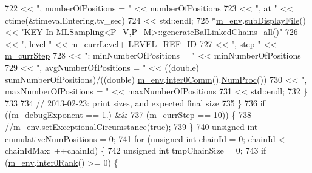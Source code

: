 \begin{DoxyCode}
722                               << \textcolor{stringliteral}{", numberOfPositions = "} << numberOfPositions
723                               << \textcolor{stringliteral}{", at "}                  << ctime(&timevalEntering.tv\_sec)
724                               << std::endl;
725       *\hyperlink{class_q_u_e_s_o_1_1_m_l_sampling_a13f1ca4fe9f94822fe572a743eaced1d}{m\_env}.\hyperlink{class_q_u_e_s_o_1_1_base_environment_a8a0064746ae8dddfece4229b9ad374d6}{subDisplayFile}() << \textcolor{stringliteral}{"KEY In
       MLSampling<P\_V,P\_M>::generateBalLinkedChains\_all()"}
726                               << \textcolor{stringliteral}{", level "}                  << \hyperlink{class_q_u_e_s_o_1_1_m_l_sampling_af9416874c856e50f3b35270e801f17e4}{m\_currLevel}+
      \hyperlink{_m_l_sampling_level_options_8h_a68d15eaf394d210effcf584b938206d3}{LEVEL\_REF\_ID}
727                               << \textcolor{stringliteral}{", step "}                   << \hyperlink{class_q_u_e_s_o_1_1_m_l_sampling_a1b1f8ccb4823bdfa26ec652f0807c63e}{m\_currStep}
728                               << \textcolor{stringliteral}{": minNumberOfPositions = "} << minNumberOfPositions
729                               << \textcolor{stringliteral}{", avgNumberOfPositions = "} << ((double) sumNumberOfPositions)/((double) 
      \hyperlink{class_q_u_e_s_o_1_1_m_l_sampling_a13f1ca4fe9f94822fe572a743eaced1d}{m\_env}.\hyperlink{class_q_u_e_s_o_1_1_base_environment_a689e4d140c74d495d97eb498714a4b82}{inter0Comm}().\hyperlink{class_q_u_e_s_o_1_1_mpi_comm_aa780721ae0fdeabc5a15e04cb0cad964}{NumProc}())
730                               << \textcolor{stringliteral}{", maxNumberOfPositions = "} << maxNumberOfPositions
731                               << std::endl;
732     \}
733 
734     \textcolor{comment}{// 2013-02-23: print sizes, and expected final size}
735   \}
736   \textcolor{keywordflow}{if} ((\hyperlink{class_q_u_e_s_o_1_1_m_l_sampling_abdd5cd35419283c33cc40a77d0f4f07f}{m\_debugExponent} == 1.) &&
737       (\hyperlink{class_q_u_e_s_o_1_1_m_l_sampling_a1b1f8ccb4823bdfa26ec652f0807c63e}{m\_currStep}      == 10)) \{
738     \textcolor{comment}{//m\_env.setExceptionalCircumstance(true);}
739   \}
740   \textcolor{keywordtype}{unsigned} \textcolor{keywordtype}{int} cumulativeNumPositions = 0;
741   \textcolor{keywordflow}{for} (\textcolor{keywordtype}{unsigned} \textcolor{keywordtype}{int} chainId = 0; chainId < chainIdMax; ++chainId) \{
742     \textcolor{keywordtype}{unsigned} \textcolor{keywordtype}{int} tmpChainSize = 0;
743     \textcolor{keywordflow}{if} (\hyperlink{class_q_u_e_s_o_1_1_m_l_sampling_a13f1ca4fe9f94822fe572a743eaced1d}{m\_env}.\hyperlink{class_q_u_e_s_o_1_1_base_environment_ae106b5bb8a80b655b88b3a26b1e7c185}{inter0Rank}() >= 0) \{

\end{DoxyCode}
